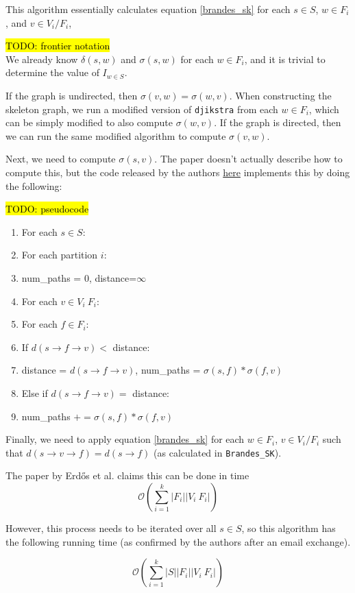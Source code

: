 \documentclass[12pt,a4paper,twoside,openright]{report}
\newcommand{\todo}[1]{\hl{TODO: #1}}
\newcommand{\ttt}[1]{\texttt{#1}}
\newcommand{\erdos}{Erd\H{o}s }
\begin{document}
\begin{enumerate}[label = \textbf{\arabic*.}]
		This algorithm essentially calculates equation \ref{brandes_sk} for each $s \in S$, $w \in F_i$, and $v \in V_i / F_i$, 
		
		\todo{frontier notation}\\
		We already know $\delta(s,w)$ and $\sigma(s,w)$ for each $w \in F_i$,  and it is trivial to determine the value of $I_{w\in S}$.
		
		If the graph is undirected, then $\sigma(v,w) = \sigma(w,v)$. When constructing the skeleton graph, we run a modified version of \ttt{djikstra} from each $w \in F_i$, which can be simply modified to also compute $\sigma(w,v)$. If the graph is directed, then we can run the same modified algorithm to compute $\sigma(v,w)$.
	
		Next, we need to compute $\sigma(s,v)$. The paper doesn't actually describe how to compute this, but the code released by the authors \href{https://cs-people.bu.edu/edori/code.html#Betweenness_centrality}{here} implements this by doing the following:
		
		\todo{pseudocode}
		\begin{enumerate}[label=\arabic*.]
			\item For each $s \in S$:
			\item For each partition $i$:
			\item num\_paths = 0, distance=$\infty$
			\item For each $v \in V_i \ F_i$:
			\item For each $f \in F_i$:
			\item If $d(s\rightarrow f \rightarrow v) < $ distance:
			\item distance = $d(s\rightarrow f \rightarrow v)$, num\_paths = $\sigma(s,f)*\sigma(f,v)$
			\item Else if $d(s\rightarrow f \rightarrow v) = $ distance:
			\item num\_paths $+=\sigma(s,f)*\sigma(f,v)$
		\end{enumerate}
	
		Finally, we need to apply equation \ref{brandes_sk} for each $w \in F_i$, $v \in V_i / F_i$ such that $d(s\rightarrow v \rightarrow f) = d (s \rightarrow f)$ (as calculated in \ttt{Brandes\_SK}).
		
		The paper by \erdos et al. claims this can be done in time
		\begin{equation}
			\mathcal{O}(\sum_{i=1}^k |F_i||V_i \ F_i|)
		\end{equation}
		
		However, this process needs to be iterated over all $s \in S$, so this algorithm has the following running time (as confirmed by the authors after an email exchange).
		
		\begin{equation}
			\mathcal{O}(\sum_{i=1}^k |S||F_i||V_i \ F_i|)
		\end{equation}
		
		
		
	\end{enumerate}
\end{document}

